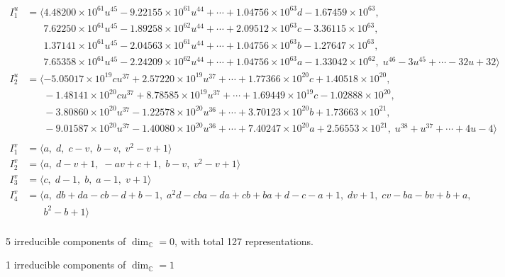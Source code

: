 \documentclass[1p]{elsarticle_modified}
\theoremstyle{definition}
\begin{document}
\begin{align*}
I^u_{1}&=\langle 
4.48200\times10^{61} u^{45}-9.22155\times10^{61} u^{44}+\cdots+1.04756\times10^{63} d-1.67459\times10^{63},\\
\phantom{I^u_{1}}&\phantom{= \langle  }7.62250\times10^{61} u^{45}-1.89258\times10^{62} u^{44}+\cdots+2.09512\times10^{63} c-3.36115\times10^{63},\\
\phantom{I^u_{1}}&\phantom{= \langle  }1.37141\times10^{61} u^{45}-2.04563\times10^{61} u^{44}+\cdots+1.04756\times10^{63} b-1.27647\times10^{63},\\
\phantom{I^u_{1}}&\phantom{= \langle  }7.65358\times10^{61} u^{45}-2.24209\times10^{62} u^{44}+\cdots+1.04756\times10^{63} a-1.33042\times10^{62},\;u^{46}-3 u^{45}+\cdots-32 u+32\rangle \\
I^u_{2}&=\langle 
-5.05017\times10^{19} c u^{37}+2.57220\times10^{19} u^{37}+\cdots+1.77366\times10^{20} c+1.40518\times10^{20},\\
\phantom{I^u_{2}}&\phantom{= \langle  }-1.48141\times10^{20} c u^{37}+8.78585\times10^{19} u^{37}+\cdots+1.69449\times10^{19} c-1.02888\times10^{20},\\
\phantom{I^u_{2}}&\phantom{= \langle  }-3.80860\times10^{20} u^{37}-1.22578\times10^{20} u^{36}+\cdots+3.70123\times10^{20} b+1.73663\times10^{21},\\
\phantom{I^u_{2}}&\phantom{= \langle  }-9.01587\times10^{20} u^{37}-1.40080\times10^{20} u^{36}+\cdots+7.40247\times10^{20} a+2.56553\times10^{21},\;u^{38}+u^{37}+\cdots+4 u-4\rangle \\
\\
I^v_{1}&=\langle 
a,\;d,\;c- v,\;b- v,\;v^2- v+1\rangle \\
I^v_{2}&=\langle 
a,\;d- v+1,\;- a v+c+1,\;b- v,\;v^2- v+1\rangle \\
I^v_{3}&=\langle 
c,\;d-1,\;b,\;a-1,\;v+1\rangle \\
I^v_{4}&=\langle 
a,\;d b+d a- c b- d+b-1,\;a^2 d- c b a- d a+c b+b a+d- c- a+1,\;d v+1,\;c v- b a- b v+b+a,\\
\phantom{I^v_{4}}&\phantom{= \langle  }b^2- b+1\rangle \\
\end{align*}
\raggedright * 5 irreducible components of $\dim_{\mathbb{C}}=0$, with total 127 representations.\\
\raggedright * 1 irreducible components of $\dim_{\mathbb{C}}=1$ \\
\end{document}
